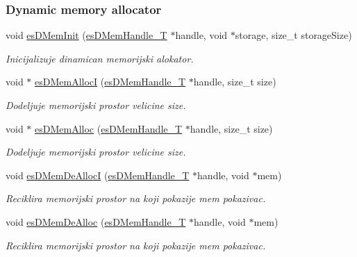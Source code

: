 \subsubsection*{Dynamic memory allocator}
\begin{DoxyCompactItemize}
\item 
void \hyperlink{group__mem__intf_ga10ef80121c0c742b9ad81f24eff91c7f}{es\-D\-Mem\-Init} (\hyperlink{group__mem__intf_gacaaf771b18b3da8fa3b67a466390080e}{es\-D\-Mem\-Handle\-\_\-\-T} $\ast$handle, void $\ast$storage, size\-\_\-t storage\-Size)
\begin{DoxyCompactList}\small\item\em Inicijalizuje dinamican memorijski alokator. \end{DoxyCompactList}\item 
void $\ast$ \hyperlink{group__mem__intf_ga807a7d2e705b1802b7671c0c903611a6}{es\-D\-Mem\-Alloc\-I} (\hyperlink{group__mem__intf_gacaaf771b18b3da8fa3b67a466390080e}{es\-D\-Mem\-Handle\-\_\-\-T} $\ast$handle, size\-\_\-t size)
\begin{DoxyCompactList}\small\item\em Dodeljuje memorijski prostor velicine {\ttfamily size}. \end{DoxyCompactList}\item 
void $\ast$ \hyperlink{group__mem__intf_ga7aa5c1f6bda178e4860f0727b1fd3590}{es\-D\-Mem\-Alloc} (\hyperlink{group__mem__intf_gacaaf771b18b3da8fa3b67a466390080e}{es\-D\-Mem\-Handle\-\_\-\-T} $\ast$handle, size\-\_\-t size)
\begin{DoxyCompactList}\small\item\em Dodeljuje memorijski prostor velicine {\ttfamily size}. \end{DoxyCompactList}\item 
void \hyperlink{group__mem__intf_gad56192526f2b6ec1f927d21b15e1bc11}{es\-D\-Mem\-De\-Alloc\-I} (\hyperlink{group__mem__intf_gacaaf771b18b3da8fa3b67a466390080e}{es\-D\-Mem\-Handle\-\_\-\-T} $\ast$handle, void $\ast$mem)
\begin{DoxyCompactList}\small\item\em Reciklira memorijski prostor na koji pokazije {\ttfamily mem} pokazivac. \end{DoxyCompactList}\item 
void \hyperlink{group__mem__intf_gad63c5b88aae0a4626763d934fdcdc9d1}{es\-D\-Mem\-De\-Alloc} (\hyperlink{group__mem__intf_gacaaf771b18b3da8fa3b67a466390080e}{es\-D\-Mem\-Handle\-\_\-\-T} $\ast$handle, void $\ast$mem)
\begin{DoxyCompactList}\small\item\em Reciklira memorijski prostor na koji pokazije {\ttfamily mem} pokazivac. \end{DoxyCompactList}\item 

\end{DoxyCompactItemize}
